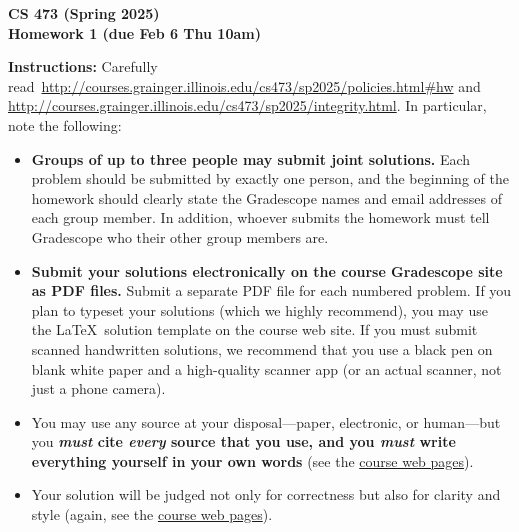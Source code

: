 \documentclass[11pt]{article}
\begin{document}
\begin{center}\Large\bf 
CS 473 (Spring 2025)\\
Homework 1 (due Feb 6 Thu 10am)
\end{center}

\medskip\noindent
{\bf Instructions:} Carefully read\  
\url{http://courses.grainger.illinois.edu/cs473/sp2025/policies.html#hw}
and \url{http://courses.grainger.illinois.edu/cs473/sp2025/integrity.html}.
In particular, note the following:

\begin{itemize}
    \item \textbf{Groups of up to three people may submit joint
       solutions.}  Each problem should be submitted by exactly one
    person, and the beginning of the homework should clearly state the
    Gradescope names and email addresses of each group member.  In
    addition, whoever submits the homework must tell Gradescope who
    their other group members are.

    \item \textbf{Submit your solutions electronically on the course
       Gradescope site as PDF files.}  Submit a separate PDF file for
    each numbered problem.  If you plan to typeset your solutions (which we highly recommend),
    you may use the \LaTeX\ solution template on the course web site.
    If you must submit scanned handwritten solutions, we recommend that you use a
    black pen on blank white paper and a high-quality scanner app (or
    an actual scanner, not just a phone camera).

    \item You may use any source at your disposal---paper,
    electronic, or human---but you {\bf \emph{must} cite \emph{every} source
    that you use, and you \emph{must} write everything yourself in
    your own words} (see the \href{http://courses.grainger.illinois.edu/cs473/sp2025/integrity.html}{course web pages}).
    
   \item Your solution will be judged not only for correctness but also for clarity and style (again, see the \href{http://courses.grainger.illinois.edu/cs473/sp2025/policies.html#hw_write}{course web pages}).    
\end{itemize}

\hrulefill
\end{document}
